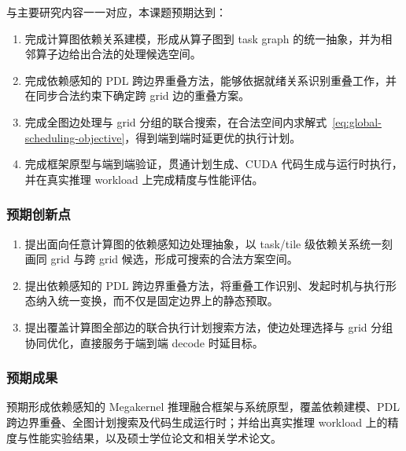 与主要研究内容一一对应，本课题预期达到：

\begin{enumerate}
  \item 完成计算图依赖关系建模，形成从算子图到 task graph 的统一抽象，并为相邻算子边给出合法的处理候选空间。
  \item 完成依赖感知的 PDL 跨边界重叠方法，能够依据就绪关系识别重叠工作，并在同步合法约束下确定跨 grid 边的重叠方案。
  \item 完成全图边处理与 grid 分组的联合搜索，在合法空间内求解式~\eqref{eq:global-scheduling-objective}，得到端到端时延更优的执行计划。
  \item 完成框架原型与端到端验证，贯通计划生成、CUDA 代码生成与运行时执行，并在真实推理 workload 上完成精度与性能评估。
\end{enumerate}

\subsubsection{预期创新点}

\begin{enumerate}
  \item 提出面向任意计算图的依赖感知边处理抽象，以 task/tile 级依赖关系统一刻画同 grid 与跨 grid 候选，形成可搜索的合法方案空间。
  \item 提出依赖感知的 PDL 跨边界重叠方法，将重叠工作识别、发起时机与执行形态纳入统一变换，而不仅是固定边界上的静态预取。
  \item 提出覆盖计算图全部边的联合执行计划搜索方法，使边处理选择与 grid 分组协同优化，直接服务于端到端 decode 时延目标。
\end{enumerate}

\subsubsection{预期成果}

预期形成依赖感知的 Megakernel 推理融合框架与系统原型，覆盖依赖建模、PDL 跨边界重叠、全图计划搜索及代码生成运行时；并给出真实推理 workload 上的精度与性能实验结果，以及硕士学位论文和相关学术论文。
